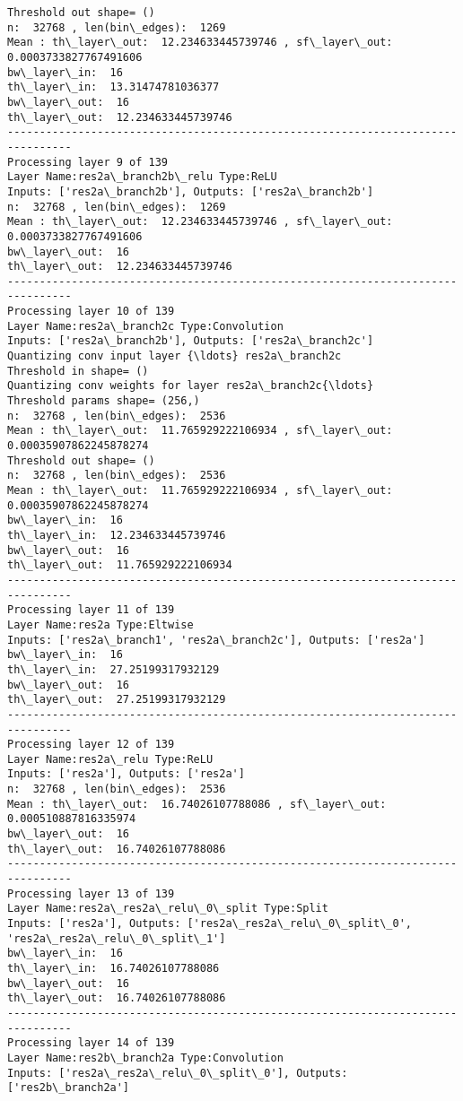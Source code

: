 \documentclass[11pt]{article}
\begin{document}
\begin{Verbatim}[commandchars=\\\{\}]
Threshold out shape= ()
n:  32768 , len(bin\_edges):  1269
Mean : th\_layer\_out:  12.234633445739746 , sf\_layer\_out:  0.0003733827767491606
bw\_layer\_in:  16
th\_layer\_in:  13.31474781036377
bw\_layer\_out:  16
th\_layer\_out:  12.234633445739746
--------------------------------------------------------------------------------
Processing layer 9 of 139
Layer Name:res2a\_branch2b\_relu Type:ReLU
Inputs: ['res2a\_branch2b'], Outputs: ['res2a\_branch2b']
n:  32768 , len(bin\_edges):  1269
Mean : th\_layer\_out:  12.234633445739746 , sf\_layer\_out:  0.0003733827767491606
bw\_layer\_out:  16
th\_layer\_out:  12.234633445739746
--------------------------------------------------------------------------------
Processing layer 10 of 139
Layer Name:res2a\_branch2c Type:Convolution
Inputs: ['res2a\_branch2b'], Outputs: ['res2a\_branch2c']
Quantizing conv input layer {\ldots} res2a\_branch2c
Threshold in shape= ()
Quantizing conv weights for layer res2a\_branch2c{\ldots}
Threshold params shape= (256,)
n:  32768 , len(bin\_edges):  2536
Mean : th\_layer\_out:  11.765929222106934 , sf\_layer\_out:  0.00035907862245878274
Threshold out shape= ()
n:  32768 , len(bin\_edges):  2536
Mean : th\_layer\_out:  11.765929222106934 , sf\_layer\_out:  0.00035907862245878274
bw\_layer\_in:  16
th\_layer\_in:  12.234633445739746
bw\_layer\_out:  16
th\_layer\_out:  11.765929222106934
--------------------------------------------------------------------------------
Processing layer 11 of 139
Layer Name:res2a Type:Eltwise
Inputs: ['res2a\_branch1', 'res2a\_branch2c'], Outputs: ['res2a']
bw\_layer\_in:  16
th\_layer\_in:  27.25199317932129
bw\_layer\_out:  16
th\_layer\_out:  27.25199317932129
--------------------------------------------------------------------------------
Processing layer 12 of 139
Layer Name:res2a\_relu Type:ReLU
Inputs: ['res2a'], Outputs: ['res2a']
n:  32768 , len(bin\_edges):  2536
Mean : th\_layer\_out:  16.74026107788086 , sf\_layer\_out:  0.000510887816335974
bw\_layer\_out:  16
th\_layer\_out:  16.74026107788086
--------------------------------------------------------------------------------
Processing layer 13 of 139
Layer Name:res2a\_res2a\_relu\_0\_split Type:Split
Inputs: ['res2a'], Outputs: ['res2a\_res2a\_relu\_0\_split\_0', 'res2a\_res2a\_relu\_0\_split\_1']
bw\_layer\_in:  16
th\_layer\_in:  16.74026107788086
bw\_layer\_out:  16
th\_layer\_out:  16.74026107788086
--------------------------------------------------------------------------------
Processing layer 14 of 139
Layer Name:res2b\_branch2a Type:Convolution
Inputs: ['res2a\_res2a\_relu\_0\_split\_0'], Outputs: ['res2b\_branch2a']

\end{Verbatim}
\end{document}
